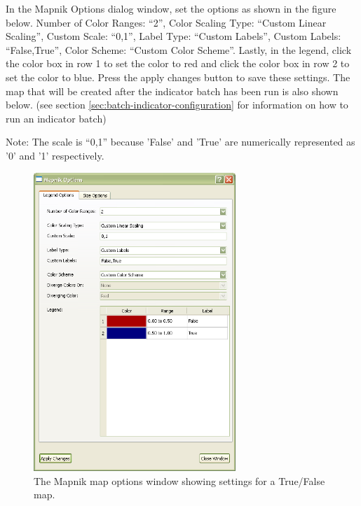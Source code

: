 In the Mapnik Options dialog window, set the options as shown in the figure below. 
Number of Color Ranges: ``2'', Color Scaling Type: ``Custom Linear Scaling'', 
Custom Scale: ``0,1'', Label Type: ``Custom Labels'', Custom Labels: ``False,True'', 
Color Scheme: ``Custom Color Scheme''. Lastly, in the legend, click the 
color box in row 1 to set the color to red and click the color box in row 2 
to set the color to blue. Press the apply changes button to save these settings. 
The map that will be created after the indicator batch has been run is also shown 
below. (see section \ref{sec:batch-indicator-configuration} 
for information on how to run an indicator batch)

Note: The scale is ``0,1'' because 'False' and 'True' are numerically 
represented as '0' and '1' respectively.

\begin{figure}[hb]
\begin{center}
\includegraphics[width=3in]{part-gui/images/result-manager-mapnik-options-example-TF.png}
\end{center}
\caption{The Mapnik map options window showing settings for a True/False map.}
\label{fig:result-manager-mapnik-options-example-TF}
\end{figure}
\clearpage

